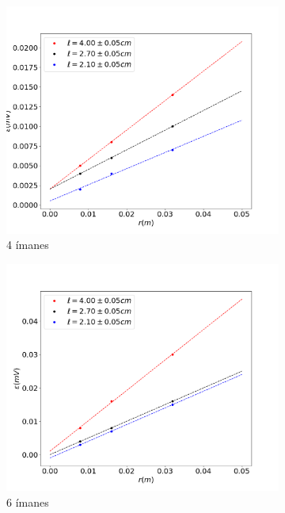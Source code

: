 \documentclass[11pt]{report}
\begin{document}
\begin{figure}[H]
	\centering
	\begin{subfigure}{.5\textwidth}
	  \centering
	  \includegraphics[width=1\linewidth]{i4rfem.png}
	  \caption{4 ímanes}
	  \label{fig:sub1}
	\end{subfigure}%
	\begin{subfigure}{.5\textwidth}
	  \centering
	  \includegraphics[width=1\linewidth]{i6rfem.png}
	  \caption{6 ímanes}
	  \label{fig:sub2}
	\end{subfigure}
	\begin{subfigure}{.5\textwidth}

\end{subfigure}
\end{figure}
\end{document}
